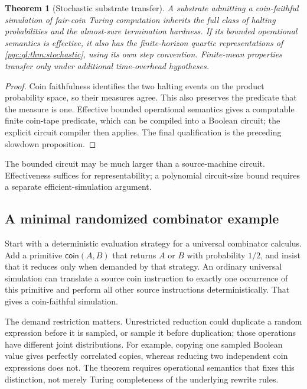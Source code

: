 \documentclass[11pt,letterpaper]{article}
\numberwithin{equation}{section}
\newtheorem{theorem}{Theorem}[section]
\theoremstyle{definition}
\theoremstyle{remark}
\begin{document}
\begin{theorem}[Stochastic substrate transfer]\label{pqc:ql:thm:transfer}
A substrate admitting a coin-faithful simulation of fair-coin Turing
computation inherits the full class of halting probabilities and the
almost-sure termination hardness. If its bounded operational semantics is
effective, it also has the finite-horizon quartic representations of
\cref{pqc:ql:thm:stochastic}, using its own step convention. Finite-mean properties
transfer only under additional time-overhead hypotheses.
\end{theorem}
\begin{proof}
Coin faithfulness identifies the two halting events on the product
probability space, so their measures agree. This also preserves the
predicate that the measure is one. Effective bounded operational
semantics gives a computable finite coin-tape predicate, which can be
compiled into a Boolean circuit; the explicit circuit compiler then
applies. The final qualification is the preceding slowdown proposition.
\end{proof}

The bounded circuit may be much larger than a source-machine circuit.
Effectiveness suffices for representability; a polynomial circuit-size
bound requires a separate efficient-simulation argument.

\subsection{A minimal randomized combinator example}
Start with a deterministic evaluation strategy for a universal combinator
calculus. Add a primitive $\mathsf{coin}(A,B)$ that returns $A$ or $B$ with
probability $1/2$, and insist that it reduces only when demanded by that
strategy. An ordinary universal simulation can translate a source coin
instruction to exactly one occurrence of this primitive and perform all
other source instructions deterministically. That gives a coin-faithful
simulation.

The demand restriction matters. Unrestricted reduction could duplicate a
random expression before it is sampled, or sample it before duplication;
those operations have different joint distributions. For example,
copying one sampled Boolean value gives perfectly correlated copies,
whereas reducing two independent coin expressions does not. The theorem
requires operational semantics that fixes this distinction, not merely
Turing completeness of the underlying rewrite rules.
\end{document}
